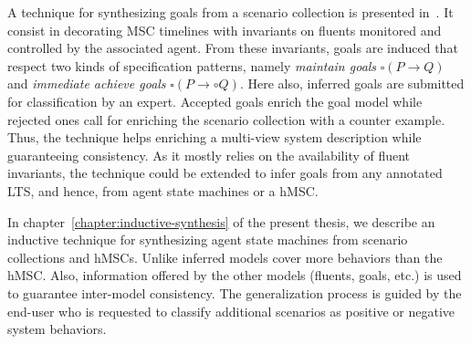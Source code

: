 A technique for synthesizing goals from a scenario collection is presented in~\cite{Damas:2006}. It consist in decorating MSC timelines with invariants on fluents monitored and controlled by the associated agent. From these invariants, goals are induced that respect two kinds of specification patterns, namely \emph{maintain goals} $\square(P \rightarrow Q)$ and \emph{immediate achieve goals} $\square(P \rightarrow \circ Q)$. Here also, inferred goals are submitted for classification by an expert. Accepted goals enrich the goal model while rejected ones call for enriching the scenario collection with a counter example. Thus, the technique helps enriching a multi-view system description while guaranteeing consistency. As it mostly relies on the availability of fluent invariants, the technique could be extended to infer goals from any annotated LTS, and hence, from agent state machines or a hMSC. 

In chapter~\ref{chapter:inductive-synthesis} of the present thesis, we describe an inductive technique for synthesizing agent state machines from scenario collections and hMSCs. Unlike \cite{Uchitel:2003} inferred models cover more behaviors than the hMSC. Also, information offered by the other models (fluents, goals, etc.) is used to guarantee inter-model consistency. The generalization process is guided by the end-user who is requested to classify additional scenarios as positive or negative system behaviors.  
